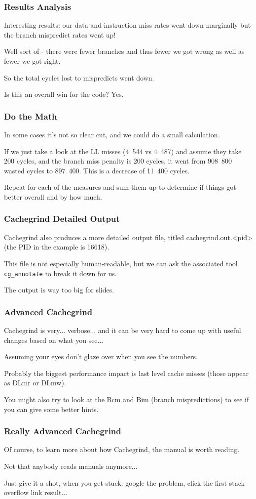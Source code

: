 \begin{frame}
\frametitle{Results Analysis}


Interesting results: our data and instruction miss rates went down marginally but the branch mispredict rates went up!

Well sort of - there were fewer branches and thus fewer we got wrong as well as fewer we got right. 

So the total cycles lost to mispredicts went down. 

Is this an overall win for the code? Yes. 


\end{frame}
\begin{frame}
\frametitle{Do the Math}

In some cases it's not so clear cut, and we could do a small calculation. 

If we just take a look at the LL misses (4~544 vs 4~487) and assume they take 200 cycles, and the branch miss penalty is 200 cycles, it went from 908~800 wasted cycles to 897~400. This is a decrease of 11~400 cycles.

  Repeat for each of the measures and sum them up to determine if things got better overall and by how much.

\end{frame}
\begin{frame}
\frametitle{Cachegrind Detailed Output}

Cachegrind also produces a more detailed output file, titled cachegrind.out.<pid> (the PID in the example is 16618). 

This file is not especially human-readable, but we can ask the associated tool \texttt{cg\_annotate} to break it down for us.

The output is way too big for slides.

\end{frame}
\begin{frame}
\frametitle{Advanced Cachegrind}

Cachegrind is very... verbose... and it can be very hard to come up with useful changes based on what you see... 

Assuming your eyes don't glaze over when you see the numbers. 

Probably the biggest performance impact is last level cache misses (those appear as DLmr or DLmw). 

You might also try to look at the Bcm and Bim (branch mispredictions) to see if you can give some better hints. 
\end{frame}
\begin{frame}
\frametitle{Really Advanced Cachegrind}

Of course, to learn more about how Cachegrind, the manual is worth reading. 

Not that anybody reads manuals anymore... 

Just give it a shot, when you get stuck, google the problem, click the first stack overflow link result...


\end{frame}



